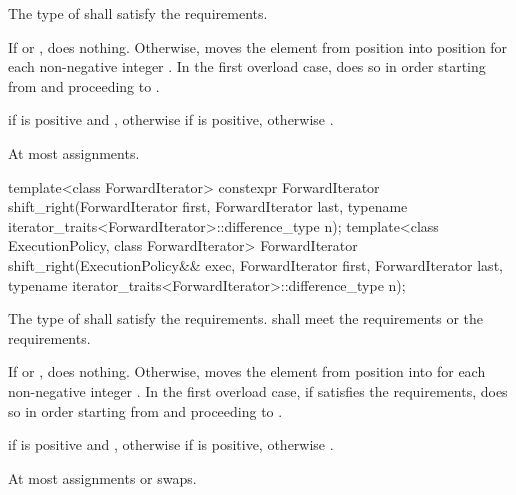 \begin{itemdescr}
\pnum
\requires
The type of  shall satisfy
the  requirements.

\pnum
\effects
If  or , does nothing.
Otherwise, moves the element
from position 
into position 
for each non-negative integer .
In the first overload case, does so in order starting
from  and proceeding to .

\pnum
\returns
{}
if  is positive and ,
otherwise  if  is positive, otherwise .

\pnum
\complexity
At most  assignments.
\end{itemdescr}

%
\begin{itemdecl}
template<class ForwardIterator>
  constexpr ForwardIterator
    shift_right(ForwardIterator first, ForwardIterator last,
                typename iterator_traits<ForwardIterator>::difference_type n);
template<class ExecutionPolicy, class ForwardIterator>
  ForwardIterator
    shift_right(ExecutionPolicy&& exec, ForwardIterator first, ForwardIterator last,
                typename iterator_traits<ForwardIterator>::difference_type n);
\end{itemdecl}

\begin{itemdescr}
\pnum
\requires
The type of  shall satisfy
the  requirements.
 shall meet
the  requirements or
the  requirements.

\pnum
\effects
If  or , does nothing.
Otherwise, moves the element
from position  into 
for each non-negative integer .
In the first overload case, if  satisfies
the  requirements,
does so in order starting
from  and proceeding to .

\pnum
\returns
{}
if  is positive and ,
otherwise  if  is positive, otherwise .

\pnum
\complexity
At most  assignments or swaps.
\end{itemdescr}

